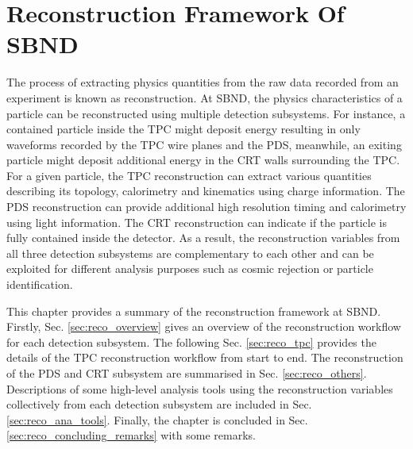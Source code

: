 
\chapter{Reconstruction Framework Of SBND}
\label{ChapterReco}

\ifpdf
    \graphicspath{{Chapter6/Figs/Raster/}{Chapter6/Figs/PDF/}{Chapter6/Figs/}}
\else
    \graphicspath{{Chapter6/Figs/Vector/}{Chapter6/Figs/}}
\fi


The process of extracting physics quantities from the raw data recorded from an experiment is known as reconstruction.
At SBND, the physics characteristics of a particle can be reconstructed using multiple detection subsystems. 
For instance, a contained particle inside the TPC might deposit energy resulting in only waveforms recorded by the TPC wire planes and the PDS, meanwhile, an exiting particle might deposit additional energy in the CRT walls surrounding the TPC.
For a given particle, the TPC reconstruction can extract various quantities describing its topology, calorimetry and kinematics using charge information.
The PDS reconstruction can provide additional high resolution timing and calorimetry using light information.
The CRT reconstruction can indicate if the particle is fully contained inside the detector.
As a result, the reconstruction variables from all three detection subsystems are complementary to each other and can be exploited for different analysis purposes such as cosmic rejection or particle identification.

This chapter provides a summary of the reconstruction framework at SBND.
Firstly, Sec. \ref{sec:reco_overview} gives an overview of the reconstruction workflow for each detection subsystem. 
The following Sec. \ref{sec:reco_tpc} provides the details of the TPC reconstruction workflow from start to end.
The reconstruction of the PDS and CRT subsystem are summarised in Sec. \ref{sec:reco_others}.
Descriptions of some high-level analysis tools using the reconstruction variables collectively from each detection subsystem are included in Sec. \ref{sec:reco_ana_tools}.                 
Finally, the chapter is concluded in Sec. \ref{sec:reco_concluding_remarks} with some remarks.


